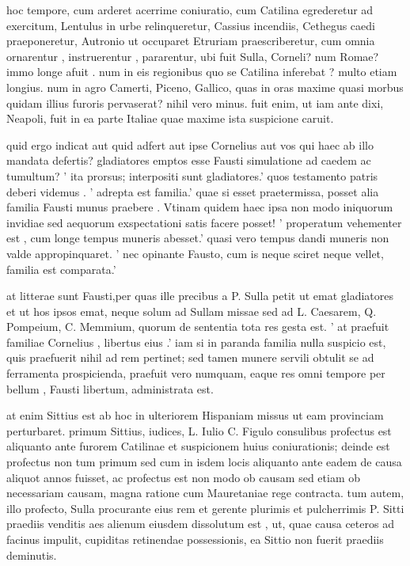  hoc tempore, cum arderet acerrime coniuratio, cum Catilina egrederetur ad exercitum, Lentulus in urbe relinqueretur, Cassius incendiis, Cethegus caedi praeponeretur, Autronio ut occuparet Etruriam praescriberetur, cum omnia ornarentur , instruerentur , pararentur, ubi fuit Sulla, Corneli? num Romae? immo longe afuit . num in eis regionibus quo se Catilina inferebat ? multo etiam longius. num in agro Camerti, Piceno, Gallico, quas in oras maxime quasi morbus quidam illius furoris pervaserat? nihil vero minus. fuit enim, ut iam ante dixi, Neapoli, fuit in ea parte Italiae quae maxime ista suspicione caruit.

 quid ergo indicat aut quid adfert aut ipse Cornelius aut vos qui haec ab illo mandata defertis? gladiatores emptos esse Fausti simulatione ad caedem ac tumultum? ' ita prorsus; interpositi sunt gladiatores.' quos testamento patris deberi videmus . ' adrepta est familia.' quae si esset praetermissa, posset alia familia Fausti munus praebere . Vtinam quidem haec ipsa non modo iniquorum invidiae sed aequorum exspectationi satis facere posset! ' properatum vehementer est , cum longe tempus muneris abesset.' quasi vero tempus dandi muneris non valde appropinquaret. ' nec opinante Fausto, cum is neque sciret neque vellet, familia est comparata.'

 at litterae sunt Fausti,per quas ille precibus a P. Sulla petit ut emat gladiatores et ut hos ipsos emat, neque solum ad Sullam missae sed ad L. Caesarem, Q. Pompeium, C. Memmium, quorum de sententia tota res gesta est. ' at praefuit familiae Cornelius , libertus eius .' iam si in paranda familia nulla suspicio est, quis praefuerit nihil ad rem pertinet; sed tamen munere servili obtulit se ad ferramenta prospicienda, praefuit vero numquam, eaque res omni tempore per bellum , Fausti libertum, administrata est.

 at enim Sittius est ab hoc in ulteriorem Hispaniam missus ut eam provinciam perturbaret. primum Sittius, iudices, L. Iulio C. Figulo consulibus profectus est aliquanto ante furorem Catilinae et suspicionem huius coniurationis; deinde est profectus non tum primum sed cum in isdem locis aliquanto ante eadem de causa aliquot annos fuisset, ac profectus est non modo ob causam sed etiam ob necessariam causam, magna ratione cum Mauretaniae rege contracta. tum autem, illo profecto, Sulla procurante eius rem et gerente plurimis et pulcherrimis P. Sitti praediis venditis aes alienum eiusdem dissolutum est , ut, quae causa ceteros ad facinus impulit, cupiditas retinendae possessionis, ea Sittio non fuerit praediis deminutis.


